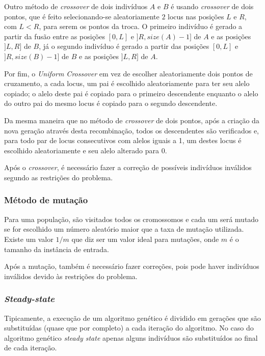 \documentclass[conference]{IEEEtran}
\begin{document}
        Outro método de \textit{crossover} de dois indivíduos $A$ e $B$ é usando \textit{crossover} de dois pontos, que é feito selecionando-se aleatoriamente $2$ locus nas posições $L$ e $R$,
        com $L < R$, para serem os pontos da troca.  O primeiro indivíduo é gerado a partir da fusão entre as posições $[0, L]$ e $]R, size(A) - 1]$ de $A$ e as posições $]L, R]$ de $B$, já
        o segundo indivíduo é gerado a partir das posições $[0, L]$ e $]R, size(B) - 1]$ de $B$ e as posições $]L, R]$ de $A$.

        Por fim, o \textit{Uniform Crossover} em vez de escolher aleatoriamente dois pontos de cruzamento, a cada locus, um pai é escolhido aleatoriamente para ter seu alelo copiado; o alelo
        deste pai é copiado para o primeiro descendente enquanto o alelo do outro pai do mesmo locus é copiado para o segundo descendente.

        Da mesma maneira que no método de \textit{crossover} de dois pontos, após a criação da nova geração através desta recombinação, todos os descendentes são verificados e, para todo par de locus
        consecutivos com alelos iguais a 1, um destes locus é escolhido aleatoriamente e seu alelo alterado para 0.

        Após o \textit{crossover}, é necessário fazer a correção de possíveis indivíduos inválidos segundo as restrições do problema.

    \subsubsection{Método de mutação}

         Para uma população, são visitados todos os cromossomos e cada um será mutado se for escolhido um número aleatório maior que a taxa de mutação utilizada. Existe um valor $1/m$
         \cite{gendreau2010handbook} que diz ser um valor ideal para mutações, onde $m$ é o tamanho da instância de entrada.
         
        Após a mutação, também é necessário fazer correções, pois pode haver indivíduos inválidos devido às restrições do problema.


    \subsubsection{\emph{Steady-state}}

        Tipicamente, a execução de um algoritmo genético é dividido em gerações que são substituídas (quase que por completo) a cada iteração do algoritmo. No caso do algoritmo genético
        \emph{steady state} apenas alguns indivíduos são substituídos ao final de cada iteração.
\end{document}
